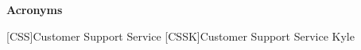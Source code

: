 
\vspace*{0.2cm}
\begin{center}
{\bf \Huge Acronyms}
\end{center}

\begin{acronym}[CSSK] %

[CSS]{Customer Support Service}
[CSSK]{Customer Support Service Kyle}

\end{acronym}




